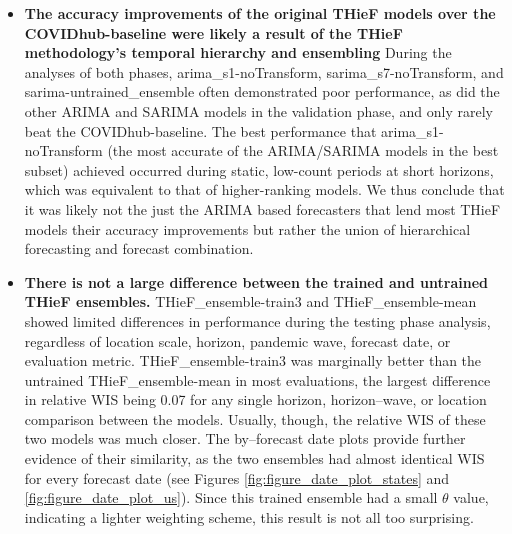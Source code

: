 \documentclass[12pt]{article}
\begin{document}
\begin{itemize}
\item \textbf{The accuracy improvements of the original THieF models over the COVIDhub-baseline were likely a result of the THieF methodology's temporal hierarchy and ensembling} \newline During the analyses of both phases, arima\_s1-noTransform, sarima\_s7-noTransform, and sarima-untrained\_ensemble often demonstrated poor performance, as did the other ARIMA and SARIMA models in the validation phase, and only rarely beat the COVIDhub-baseline. The best performance that arima\_s1-noTransform (the most accurate of the ARIMA/SARIMA models in the best subset) achieved occurred during static, low-count periods at short horizons, which was equivalent to that of higher-ranking models. We thus conclude that it was likely not the just the ARIMA based forecasters that lend most THieF models their accuracy improvements but rather the union of hierarchical forecasting and forecast combination.

\item \textbf{There is not a large difference between the trained and untrained THieF ensembles.} \newline THieF\_ensemble-train3 and THieF\_ensemble-mean showed limited differences in performance during the testing phase analysis, regardless of location scale, horizon, pandemic wave, forecast date, or evaluation metric. THieF\_ensemble-train3 was marginally better than the untrained THieF\_ensemble-mean in most evaluations, the largest difference in relative WIS being 0.07 for any single horizon, horizon--wave, or location comparison between the models. Usually, though, the relative WIS of these two models was much closer. The by--forecast date plots provide further evidence of their similarity, as the two ensembles had almost identical WIS for every forecast date (see Figures \ref{fig:figure_date_plot_states} and \ref{fig:figure_date_plot_us}). Since this trained ensemble had a small $\theta$ value, indicating a lighter weighting scheme, this result is not all too surprising.


\end{itemize}
\end{document}
